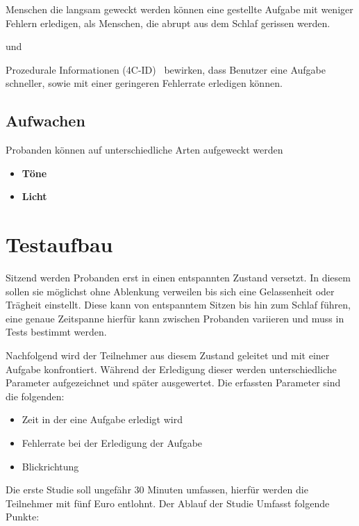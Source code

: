 \begin{hyp}\label{hyp:erfolgreicher}
	Menschen die langsam geweckt werden können eine gestellte Aufgabe mit weniger Fehlern erledigen, als Menschen, die abrupt aus dem Schlaf gerissen werden.
\end{hyp}

und

\begin{hyp}\label{hyp:gestaltung}
	Prozedurale Informationen (4C-ID)~\cite{van2002blueprints} bewirken, dass Benutzer eine Aufgabe schneller, sowie mit einer geringeren Fehlerrate erledigen können.
\end{hyp}

\subsection{Aufwachen}
Probanden können auf unterschiedliche Arten aufgeweckt werden~\cite{jewett1999time, ferrara2000sleep}
\begin{itemize}
	\item \textbf{Töne}
	\item \textbf{Licht}
\end{itemize}

\section{Testaufbau}
Sitzend werden Probanden erst in einen entspannten Zustand versetzt. In diesem sollen sie möglichst ohne Ablenkung verweilen bis sich eine Gelassenheit oder Trägheit einstellt. Diese kann von entspanntem Sitzen bis hin zum Schlaf führen, eine genaue Zeitspanne hierfür kann zwischen Probanden variieren und muss in Tests bestimmt werden.

Nachfolgend wird der Teilnehmer aus diesem Zustand geleitet und mit einer Aufgabe konfrontiert. Während der Erledigung dieser werden unterschiedliche Parameter aufgezeichnet und später ausgewertet. Die erfassten Parameter sind die folgenden:

\begin{itemize}
	\item Zeit in der eine Aufgabe erledigt wird
	\item Fehlerrate bei der Erledigung der Aufgabe
	\item Blickrichtung
\end{itemize}

Die erste Studie soll ungefähr 30 Minuten umfassen, hierfür werden die Teilnehmer mit fünf Euro entlohnt. Der Ablauf der Studie Umfasst folgende Punkte:

